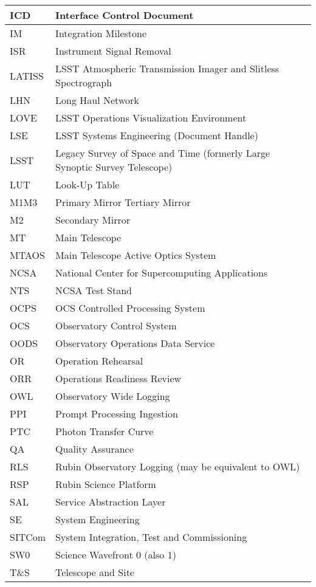 \begin{longtable}{p{}p{}}
ICD & Interface Control Document \\\hline
IM & Integration Milestone \\\hline
ISR & Instrument Signal Removal \\\hline
LATISS & LSST Atmospheric Transmission Imager and Slitless Spectrograph \\\hline
LHN & Long Haul Network \\\hline
LOVE & LSST Operations Visualization Environment \\\hline
LSE & LSST Systems Engineering (Document Handle) \\\hline
LSST & Legacy Survey of Space and Time (formerly Large Synoptic Survey Telescope) \\\hline
LUT & Look-Up Table \\\hline
M1M3 & Primary Mirror Tertiary Mirror \\\hline
M2 & Secondary Mirror \\\hline
MT & Main Telescope \\\hline
MTAOS & Main Telescope Active Optics System \\\hline
NCSA & National Center for Supercomputing Applications \\\hline
NTS & NCSA Test Stand \\\hline
OCPS & OCS Controlled Processing System \\\hline
OCS & Observatory Control System \\\hline
OODS & Observatory Operations Data Service \\\hline
OR & Operation Rehearsal \\\hline
ORR & Operations Readiness Review \\\hline
OWL & Observatory Wide Logging \\\hline
PPI & Prompt Processing Ingestion \\\hline
PTC & Photon Transfer Curve \\\hline
QA & Quality Assurance \\\hline
RLS & Rubin Observatory Logging (may be equivalent to OWL) \\\hline
RSP & Rubin Science Platform \\\hline
SAL & Service Abstraction Layer \\\hline
SE & System Engineering \\\hline
SITCom & System Integration, Test and Commissioning \\\hline
SW0 & Science Wavefront 0 (also 1) \\\hline
T\&S & Telescope and Site \\\hline

\end{longtable}
